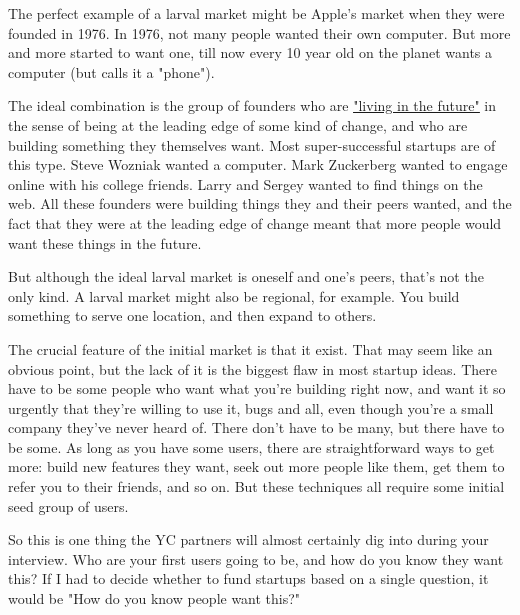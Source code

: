 The perfect example of a larval market
                  might be Apple's market when they were founded in 1976. In
                  1976, not many people wanted their own computer. But more and
                  more started to want one, till now every 10 year old on the
                  planet wants a computer (but calls it a "phone").

The
                  ideal combination is the group of founders who are
                  \href{http://www.paulgraham.com/startupideas.html}{\underline{"living in the future"}}
                  in the sense of being at the leading edge of some kind of
                  change, and who are building something they themselves want.
                  Most super-successful startups are of this type. Steve Wozniak
                  wanted a computer. Mark Zuckerberg wanted to engage online
                  with his college friends. Larry and Sergey wanted to find
                  things on the web. All these founders were building things
                  they and their peers wanted, and the fact that they were at
                  the leading edge of change meant that more people would want
                  these things in the future.

But although the ideal
                  larval market is oneself and one's peers, that's not the only
                  kind. A larval market might also be regional, for example. You
                  build something to serve one location, and then expand to
                  others.

The crucial feature of the initial market
                  is that it exist. That may seem like an obvious point, but the
                  lack of it is the biggest flaw in most startup ideas. There
                  have to be some people who want what you're building right
                  now, and want it so urgently that they're willing to use it,
                  bugs and all, even though you're a small company they've never
                  heard of. There don't have to be many, but there have to be
                  some. As long as you have some users, there are
                  straightforward ways to get more: build new features they
                  want, seek out more people like them, get them to refer you to
                  their friends, and so on. But these techniques all require
                  some initial seed group of users.

So this is one
                  thing the YC partners will almost certainly dig into during
                  your interview. Who are your first users going to be, and how
                  do you know they want this? If I had to decide whether to fund
                  startups based on a single question, it would be "How do you
                  know people want this?"

